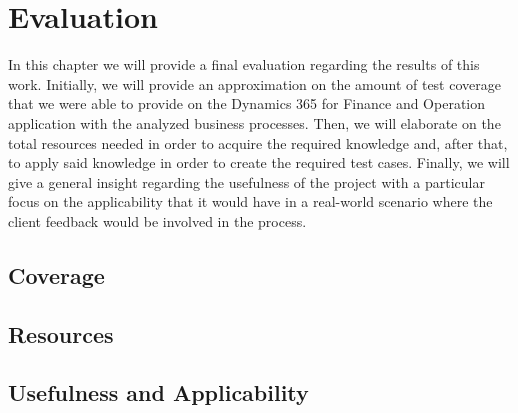 \chapter{Evaluation}

In this chapter we will provide a final evaluation regarding the results of this work. Initially, we will provide an approximation on the amount of test coverage that we were able to provide on the Dynamics 365 for Finance and Operation application with the analyzed business processes. Then, we will elaborate on the total resources needed in order to acquire the required knowledge and, after that, to apply said knowledge in order to create the required test cases. Finally, we will give a general insight regarding the usefulness of the project with a particular focus on the applicability that it would have in a real-world scenario where the client feedback would be involved in the process. 

\section{Coverage} 

\section{Resources} 

\section{Usefulness and Applicability} 